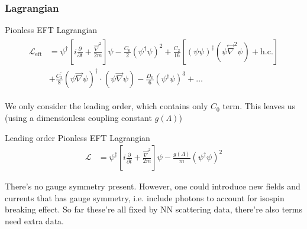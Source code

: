 \begin{frame}
	\frametitle{Lagrangian~\parencite{Bedaque2002}}

	\begin{alertblock}{Pionless EFT Lagrangian}
		\begin{align}
			\begin{aligned}
				\mathcal{L}_{\mathrm{eft}} & =\psi^{\dagger}\left[i \frac{\partial}{\partial t}+\frac{\vec{\nabla}^{2}}{2 m}\right] \psi-\frac{C_{0}}{2}\left(\psi^{\dagger} \psi\right)^{2}+\frac{C_{2}}{16}\left[(\psi \psi)^{\dagger}\left(\psi \stackrel{\leftrightarrow}{\nabla}^{2} \psi\right)+\mathrm{h.c.}\right] \\
				                           & +\frac{C_{2}^{\prime}}{8}(\psi \vec{\nabla} \psi)^{\dagger} \cdot(\psi \vec{\nabla} \psi)-\frac{D_{0}}{6}\left(\psi^{\dagger} \psi\right)^{3}+\ldots
			\end{aligned}
		\end{align}
	\end{alertblock}
	We only consider the leading order, which contains only $C_0$ term. This leaves us (using a dimensionless coupling constant $g(\Lambda)$)
	\begin{alertblock}{Leading order Pionless EFT Lagrangian}
		\begin{align}
			\mathcal{L} & =\psi^{\dagger}\left[i \frac{\partial}{\partial t}+\frac{\vec{\nabla}^{2}}{2 m}\right] \psi-\frac{g(\Lambda)}{m}\left(\psi^{\dagger} \psi\right)^{2}
		\end{align}
	\end{alertblock}
	There's no gauge symmetry present. However, one could introduce new fields and currents that has gauge symmetry, i.e. include photons to account for isospin breaking effect. So far these're all fixed by NN scattering data, there're also terms need extra data.

\end{frame}

